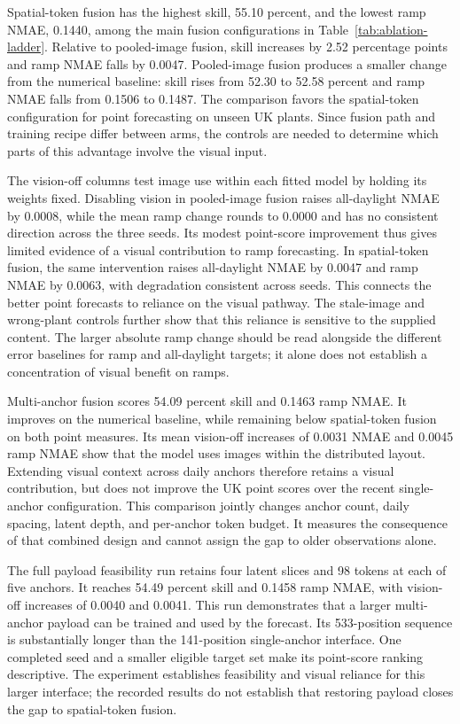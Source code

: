 Spatial-token fusion has the highest skill, 55.10 percent, and the lowest ramp NMAE, 0.1440, among the main fusion configurations in Table~\ref{tab:ablation-ladder}. Relative to pooled-image fusion, skill increases by 2.52 percentage points and ramp NMAE falls by 0.0047. Pooled-image fusion produces a smaller change from the numerical baseline: skill rises from 52.30 to 52.58 percent and ramp NMAE falls from 0.1506 to 0.1487. The comparison favors the spatial-token configuration for point forecasting on unseen UK plants. Since fusion path and training recipe differ between arms, the controls are needed to determine which parts of this advantage involve the visual input.

The vision-off columns test image use within each fitted model by holding its weights fixed. Disabling vision in pooled-image fusion raises all-daylight NMAE by 0.0008, while the mean ramp change rounds to 0.0000 and has no consistent direction across the three seeds. Its modest point-score improvement thus gives limited evidence of a visual contribution to ramp forecasting. In spatial-token fusion, the same intervention raises all-daylight NMAE by 0.0047 and ramp NMAE by 0.0063, with degradation consistent across seeds. This connects the better point forecasts to reliance on the visual pathway. The stale-image and wrong-plant controls further show that this reliance is sensitive to the supplied content. The larger absolute ramp change should be read alongside the different error baselines for ramp and all-daylight targets; it alone does not establish a concentration of visual benefit on ramps.

Multi-anchor fusion scores 54.09 percent skill and 0.1463 ramp NMAE. It improves on the numerical baseline, while remaining below spatial-token fusion on both point measures. Its mean vision-off increases of 0.0031 NMAE and 0.0045 ramp NMAE show that the model uses images within the distributed layout. Extending visual context across daily anchors therefore retains a visual contribution, but does not improve the UK point scores over the recent single-anchor configuration. This comparison jointly changes anchor count, daily spacing, latent depth, and per-anchor token budget. It measures the consequence of that combined design and cannot assign the gap to older observations alone.

The full payload feasibility run retains four latent slices and 98 tokens at each of five anchors. It reaches 54.49 percent skill and 0.1458 ramp NMAE, with vision-off increases of 0.0040 and 0.0041. This run demonstrates that a larger multi-anchor payload can be trained and used by the forecast. Its 533-position sequence is substantially longer than the 141-position single-anchor interface. One completed seed and a smaller eligible target set make its point-score ranking descriptive. The experiment establishes feasibility and visual reliance for this larger interface; the recorded results do not establish that restoring payload closes the gap to spatial-token fusion.

